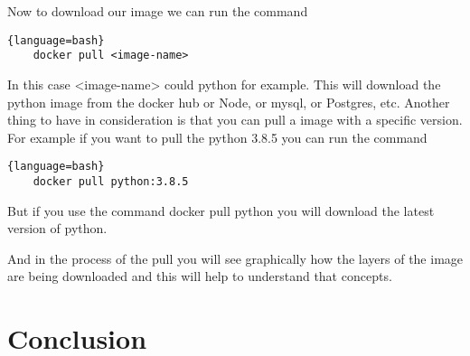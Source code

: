 \documentclass{article}
\begin{document}
Now to download our image we can run the command
\begin{lstlisting}{language=bash}
    docker pull <image-name>
\end{lstlisting}

In this case <image-name> could python for example. This will download the python image from the docker hub or Node, or mysql, or Postgres, etc.
Another thing to have in consideration is that you can pull a image with a specific version. For example if you want to pull the python 3.8.5 
you can run the command
\begin{lstlisting}{language=bash}
    docker pull python:3.8.5
\end{lstlisting}

But if you use the command docker pull python you will download the latest version of python.

And in the process of the pull you will see graphically how the layers of the image are being downloaded and this will help to understand that concepts.



\section*{Conclusion}
\end{document}
